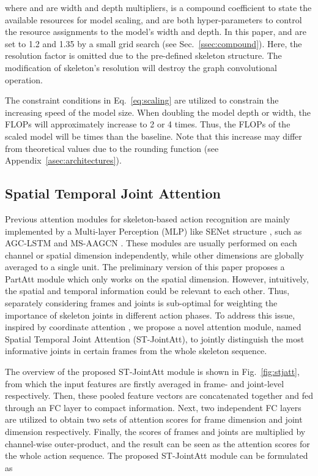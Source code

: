 \documentclass[10pt,journal,compsoc]{IEEEtran}
\begin{document}
where  and  are width and depth multipliers,  is a compound coefficient to state the available resources for model scaling,  and  are both hyper-parameters to control the resource assignments to the model's width and depth. In this paper,  and  are set to 1.2 and 1.35 by a small grid search (see Sec.~\ref{ssec:compound}). Here, the resolution factor is omitted due to the pre-defined skeleton structure. The modification of skeleton's resolution will destroy the graph convolutional operation.

The constraint conditions in Eq.~\ref{eq:scaling} are utilized to constrain the increasing speed of the model size. When doubling the model depth or width, the FLOPs will approximately increase to 2 or 4 times. Thus, the FLOPs of the scaled model will be  times than the baseline. Note that this increase may differ from theoretical values due to the rounding function (see Appendix~\ref{asec:architectures}).

\subsection{Spatial Temporal Joint Attention}
\label{ssec:stjatt}

Previous attention modules for skeleton-based action recognition are mainly implemented by a Multi-layer Perception (MLP) like SENet structure \cite{hu2018squeeze}, such as AGC-LSTM \cite{si2019attention} and MS-AAGCN \cite{shi2020skeleton}. These modules are usually performed on each channel or spatial dimension independently, while other dimensions are globally averaged to a single unit. The preliminary version of this paper \cite{song2020stronger} proposes a PartAtt module which only works on the spatial dimension. However, intuitively, the spatial and temporal information could be relevant to each other. Thus, separately considering frames and joints is sub-optimal for weighting the importance of skeleton joints in different action phases. To address this issue, inspired by coordinate attention \cite{hou2021coordinate}, we propose a novel attention module, named Spatial Temporal Joint Attention (ST-JointAtt), to jointly distinguish the most informative joints in certain frames from the whole skeleton sequence.

The overview of the proposed ST-JointAtt module is shown in Fig.~\ref{fig:stjatt}, from which the input features are firstly averaged in frame- and joint-level respectively. Then, these pooled feature vectors are concatenated together and fed through an FC layer to compact information. Next, two independent FC layers are utilized to obtain two sets of attention scores for frame dimension and joint dimension respectively. Finally, the scores of frames and joints are multiplied by channel-wise outer-product, and the result can be seen as the attention scores for the whole action sequence. The proposed ST-JointAtt module can be formulated as
\end{document}
